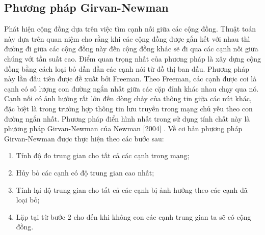 \subsection{Phương pháp Girvan-Newman}
Phát hiện cộng đồng dựa trên việc tìm cạnh nối giữa các cộng đồng. Thuật toán này dựa trên quan niệm cho rằng khi các cộng đồng được gắn kết với nhau thì đường đi giữa các cộng đồng này đến cộng đồng khác sẽ đi qua các cạnh nối giữa chúng với tần suất cao. Điểm quan trọng nhất của phương pháp là xây dựng cộng đồng bằng cách loại bỏ dần dần các cạnh nói từ đồ thị ban đầu. Phương pháp này lần đầu tiên được đề xuất bởi Freeman. Theo Freeman, các cạnh được coi là cạnh có số lượng con đường ngắn nhất giữa các cặp đỉnh khác nhau chạy qua nó. Cạnh nối có ảnh hưởng rất lớn đến dòng chảy của thông tin giữa các nút khác, đặc biệt là trong trường hợp thông tin lưu truyền trong mạng chủ yếu theo con đường ngắn nhất. Phương pháp điển hình nhất trong sử dụng tính chất này là phương pháp Girvan-Newman của Newman [2004] \cite{newman2004fast}. Về cơ bản phương pháp Girvan-Newman được thực hiện theo các bước sau:
\begin{enumerate}
	\item Tính độ đo trung gian cho tất cả các cạnh trong mạng;
	\item Hủy bỏ các cạnh có độ trung gian cao nhất;
	\item Tính lại độ trung gian cho tất cả các cạnh bị ảnh hưởng theo các cạnh đã loại bỏ;
	\item Lặp tại từ bước 2 cho đến khi không con các cạnh trung gian ta sẽ có cộng đồng.
\end{enumerate}

